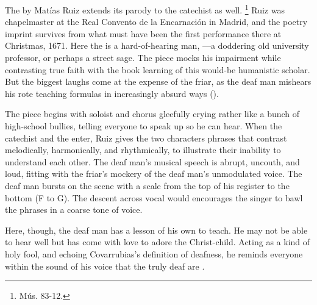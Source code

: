 The  by Matías Ruiz extends its parody to the catechist as well.%
\footnote{\signature{E-E}{Mús. 83-12}.}
Ruiz was chapelmaster at the Real Convento de la Encarnación in Madrid, and the poetry imprint survives from what must have been the first performance there at Christmas, 1671.%
\autocite{1671-Madrid-Enc-Nav}
Here the  is a hard-of-hearing man, ---a doddering old university professor, or perhaps a street sage.
The piece mocks his impairment while contrasting true faith with the book learning of this would-be humanistic scholar.
But the biggest laughs come at the expense of the friar, as the deaf man mishears his rote teaching formulas in increasingly absurd ways ().


The piece begins with soloist and chorus gleefully crying   rather like a bunch of high-school bullies, telling everyone to speak up so he can hear.
When the catechist and the  enter, Ruiz gives the two characters phrases that contrast melodically, harmonically, and rhythmically, to illustrate their inability to understand each other.
The deaf man's musical speech is abrupt, uncouth, and loud, fitting with the friar's mockery of the deaf man's unmodulated voice.
The deaf man bursts on the scene with a scale from the top of his register to the bottom (F to G).
The descent across vocal  would encourages the singer to bawl the phrases in a coarse tone of voice.



Here, though, the deaf man has a lesson of his own to teach.
He may not be able to hear well but has come with love to adore the Christ-child. 
Acting as a kind of holy fool, and echoing Covarrubias's definition of deafness, he reminds everyone within the sound of his voice that the truly deaf are .

